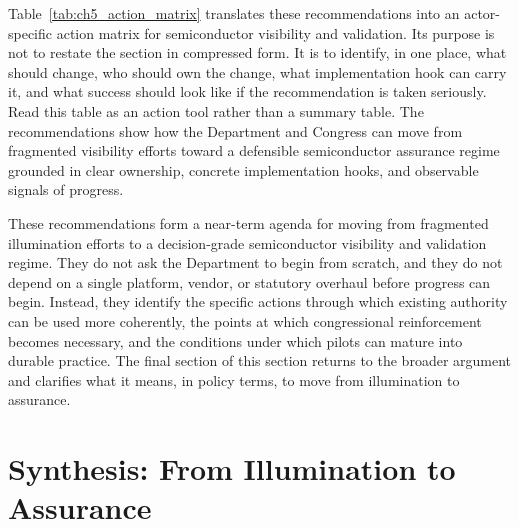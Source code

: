 Table~\ref{tab:ch5_action_matrix} translates these recommendations into an actor-specific action matrix for semiconductor visibility and validation. Its purpose is not to restate the section in compressed form. It is to identify, in one place, what should change, who should own the change, what implementation hook can carry it, and what success should look like if the recommendation is taken seriously. Read this table as an action tool rather than a summary table.  The recommendations show how the Department and Congress can move from fragmented visibility efforts toward a defensible semiconductor assurance regime grounded in clear ownership, concrete implementation hooks, and observable signals of progress.

These recommendations form a near-term agenda for moving from fragmented illumination efforts to a decision-grade semiconductor visibility and validation regime. They do not ask the Department to begin from scratch, and they do not depend on a single platform, vendor, or statutory overhaul before progress can begin. Instead, they identify the specific actions through which existing authority can be used more coherently, the points at which congressional reinforcement becomes necessary, and the conditions under which pilots can mature into durable practice. The final section of this section returns to the broader argument and clarifies what it means, in policy terms, to move from illumination to assurance.

\begin{landscape}
\pagestyle{landscape}
\begin{table}[!p]
  \centering
  \footnotesize
  \renewcommand{\arraystretch}{1.1}
  \setlength{\tabcolsep}{4pt}
  \captionsetup{skip=4pt}

  \caption[\textit{Action Matrix for DoD and Congressional Recommendations}]
{\textit{Action Matrix for DoD and Congressional Recommendations}}

  \label{tab:ch5_action_matrix}

  

\end{table}
\end{landscape}

\section{Synthesis: From Illumination to Assurance}
\label{sec:ch5_synthesis}

